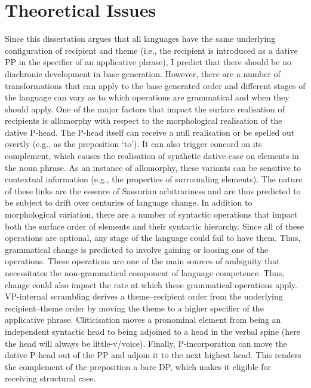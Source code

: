 \section{Theoretical Issues}
	Since this dissertation argues that all languages have the same underlying configuration of recipient and theme (i.e., the recipient is introduced as a dative PP in the specifier of an applicative phrase), I predict that there should be no diachronic development in base generation. However, there are a number of transformations that can apply to the base generated order and different stages of the language can vary as to which operations are grammatical and when they should apply.
	One of the major factors that impact the surface realisation of recipients is allomorphy with respect to the morphological realisation of the dative P-head. The P-head itself can receive a null realisation or be spelled out overtly (e.g., as the preposition `to'). It can also trigger concord on its complement, which causes the realisation of synthetic dative case on elements in the noun phrase. As an instance of allomorphy, these variants can be sensitive to contextual information (e.g., the properties of surrounding elements). The nature of these links are the essence of Sassurian arbitrariness and are thus predicted to be subject to drift over centuries of language change.
	In addition to morphological variation, there are a number of syntactic operations that impact both the surface order of elements and their syntactic hierarchy. Since all of these operations are optional, any stage of the language could fail to have them. Thus, grammatical change is predicted to involve gaining or loosing one of the operations. These operations are one of the main sources of ambiguity that necessitates the non-grammatical component of language competence. Thus, change could also impact the rate at which these grammatical operations apply. VP-internal scrambling derives a theme--recipient order from the underlying recipient--theme order by moving the theme to a higher specifier of the applicative phrase. Cliticisation moves a pronominal element from being an independent syntactic head to being adjoined to a head in the verbal spine (here the head will always be little-v/voice). Finally, P-incorporation can move the dative P-head out of the PP and adjoin it to the next highest head. This renders the complement of the preposition a bare DP, which makes it eligible for receiving structural case.
